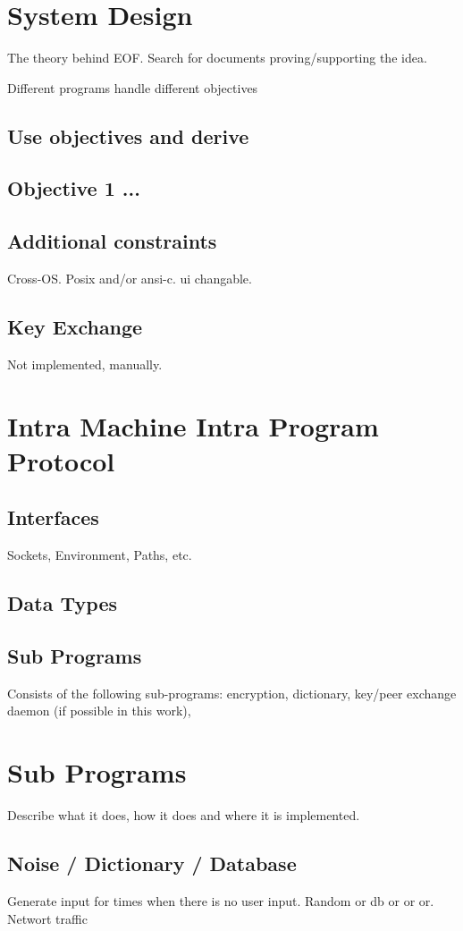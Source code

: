 \section{System Design}
The theory behind EOF.
Search for documents proving/supporting the idea.

Different programs handle different objectives
\subsection{Use objectives and derive}
\subsection{Objective 1 ...}
\subsection{Additional constraints}
Cross-OS. Posix and/or ansi-c. ui changable.
\subsection{Key Exchange}
Not implemented, manually.
\section{Intra Machine Intra Program Protocol}
\subsection{Interfaces}
Sockets, Environment, Paths, etc.
\subsection{Data Types}
\subsection{Sub Programs}
Consists of the following sub-programs:
encryption, dictionary, key/peer exchange daemon (if possible in this work),
\section{Sub Programs}
Describe what it does, how it does and where it is implemented.
\subsection{Noise / Dictionary / Database}
Generate input for times when there is no user input.
Random or db or or or.
Networt traffic
